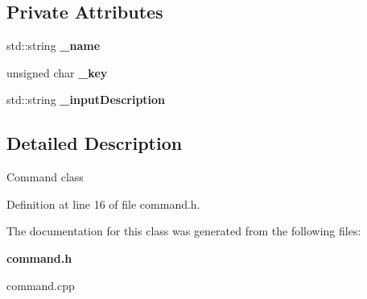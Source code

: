 \subsection*{Private Attributes}
\begin{DoxyCompactItemize}
\item 
std\-::string {\bfseries \-\_\-name}\label{classSoundfieldViewer_1_1Command_a79d2fd9dfe53f637681090f85e0a688b}

\item 
unsigned char {\bfseries \-\_\-key}\label{classSoundfieldViewer_1_1Command_a344e829db2a03f7086bde4f8842e243c}

\item 
std\-::string {\bfseries \-\_\-input\-Description}\label{classSoundfieldViewer_1_1Command_af19bc904a90bbb025999df928a2653be}

\end{DoxyCompactItemize}


\subsection{Detailed Description}
Command class 

Definition at line 16 of file command.\-h.



The documentation for this class was generated from the following files\-:\begin{DoxyCompactItemize}
\item 
{\bf command.\-h}\item 
command.\-cpp\end{DoxyCompactItemize}
